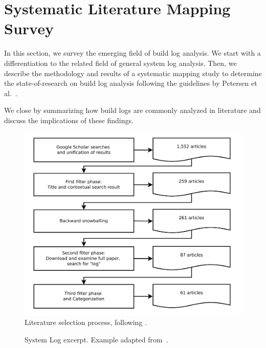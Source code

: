 \section{Systematic Literature Mapping Survey}
\label{sec:survey}

In this section, we survey the emerging field of build log
analysis.
We start with a differentiation to the related field of general
system log analysis.
Then, we describe the methodology and results of a systematic mapping
study to
determine the state-of-research on build log analysis following the
guidelines by Petersen et
al.~\cite{petersen2008systematic,petersen2015guidelines}.

We close by summarizing how build logs are commonly
analyzed in literature and discuss the implications of these findings.

\begin{figure}[tb]
	\centering
	\includegraphics[width=\columnwidth, clip]{img/lit_survey.pdf}
	\caption{Literature selection process, following
	\cite{petersen2015guidelines}.}
	\label{fig:lit-survey}
\end{figure}


\begin{figure}[b]
  \centering
  
  \caption{System Log excerpt.
Example adapted from~\cite{he2017towards}.}
  \label{lst:system-log}
\end{figure}

